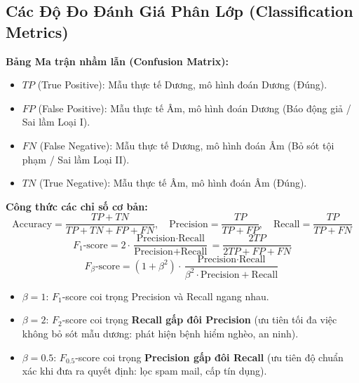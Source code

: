 \documentclass[10pt,a4paper]{article}
\begin{document}
\subsection{Các Độ Đo Đánh Giá Phân Lớp (Classification Metrics)}
\textbf{Bảng Ma trận nhầm lẫn (Confusion Matrix):}
\begin{itemize}[leftmargin=*]
    \item $TP$ (True Positive): Mẫu thực tế Dương, mô hình đoán Dương (Đúng).
    \item $FP$ (False Positive): Mẫu thực tế Âm, mô hình đoán Dương (Báo động giả / Sai lầm Loại I).
    \item $FN$ (False Negative): Mẫu thực tế Dương, mô hình đoán Âm (Bỏ sót tội phạm / Sai lầm Loại II).
    \item $TN$ (True Negative): Mẫu thực tế Âm, mô hình đoán Âm (Đúng).
\end{itemize}

\textbf{Công thức các chỉ số cơ bản:}
\begin{equation}
    \text{Accuracy} = \frac{TP + TN}{TP + TN + FP + FN}, \quad \text{Precision} = \frac{TP}{TP + FP}, \quad \text{Recall} = \frac{TP}{TP + FN}
\end{equation}
\begin{equation}
    F_1\text{-score} = 2 \cdot \frac{\text{Precision} \cdot \text{Recall}}{\text{Precision} + \text{Recall}} = \frac{2 TP}{2 TP + FP + FN}
\end{equation}
\begin{equation}
    F_\beta\text{-score} = (1 + \beta^2) \cdot \frac{\text{Precision} \cdot \text{Recall}}{\beta^2 \cdot \text{Precision} + \text{Recall}}
\end{equation}
\begin{itemize}[leftmargin=*]
    \item $\beta = 1$: $F_1$-score coi trọng Precision và Recall ngang nhau.
    \item $\beta = 2$: $F_2$-score coi trọng \textbf{Recall gấp đôi Precision} (ưu tiên tối đa việc không bỏ sót mẫu dương: phát hiện bệnh hiểm nghèo, an ninh).
    \item $\beta = 0.5$: $F_{0.5}$-score coi trọng \textbf{Precision gấp đôi Recall} (ưu tiên độ chuẩn xác khi đưa ra quyết định: lọc spam mail, cấp tín dụng).
\end{itemize}
\end{document}
